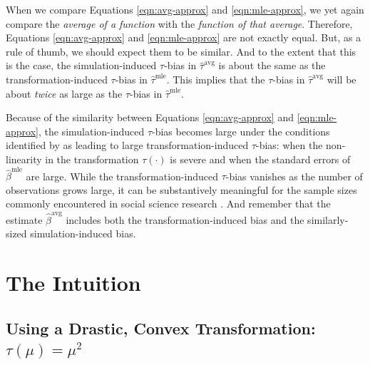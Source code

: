 \documentclass[11pt]{article}
\begin{document}
When we compare Equations \ref{eqn:avg-approx} and \ref{eqn:mle-approx}, we yet again compare the \textit{average of a function} with the \textit{function of that average}.
Therefore, Equations \ref{eqn:avg-approx} and \ref{eqn:mle-approx} are not exactly equal.
But, as a rule of thumb, we should expect them to be similar.
And to the extent that this is the case, the simulation-induced $\tau$-bias in $\hat{\tau}^\text{avg}$ is about the same as the transformation-induced $\tau$-bias in $\hat{\tau}^\text{mle}$. This implies that the $\tau$-bias in $\hat{\tau}^\text{avg}$ will be about \emph{twice} as large as the $\tau$-bias in $\hat{\tau}^\text{mle}$.


Because of the similarity between Equations \ref{eqn:avg-approx} and \ref{eqn:mle-approx}, the simulation-induced $\tau$-bias becomes large under the conditions identified by \cite{Rainey2017} as leading to large transformation-induced $\tau$-bias: when the non-linearity in the transformation $\tau(\cdot)$ is severe and when the standard errors of $\hat{\beta}^\text{mle}$ are large.
While the transformation-induced $\tau$-bias vanishes as the number of observations grows large, it can be substantively meaningful for the sample sizes commonly encountered in social science research \citep{Rainey2017}.
And remember that the estimate $\hat{\beta}^\text{avg}$ includes both the transformation-induced bias and the similarly-sized simulation-induced bias.

\section*{The Intuition}

\subsection*{Using a Drastic, Convex Transformation: $\tau(\mu) = \mu^2$}
\end{document}

